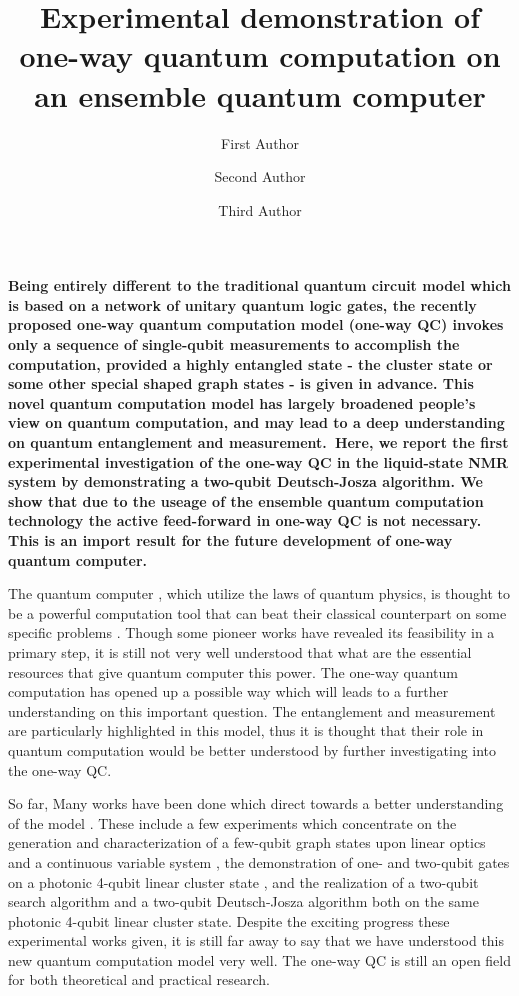 \documentclass[showpacs,superscriptaddress,twocolumn,prl]{revtex4}
\begin{document}
\title{Experimental demonstration of one-way quantum computation on an
ensemble quantum computer}
\author{First Author}
\author{Second Author}
\author{Third Author}
\maketitle

\textbf{Being entirely different to the traditional quantum circuit model
\cite{Chuang} which is based on a network of unitary quantum logic gates,
the recently proposed one-way quantum computation model (one-way QC) \cite%
{onewayPRL,onewayPRA} invokes only a sequence of single-qubit measurements
to accomplish the computation, provided a highly entangled state - the
cluster state \cite{clusterstate} or some other special shaped graph states
\cite{othergraph} - is given in advance. This novel quantum computation
model has largely broadened people's view on quantum computation, and may
lead to a deep understanding on quantum entanglement and measurement.\ Here,
we report the first experimental investigation of the one-way QC in the
liquid-state NMR system by demonstrating a two-qubit Deutsch-Josza
algorithm. We show that due to the useage of the ensemble quantum
computation technology the active feed-forward in one-way QC is not
necessary. This is an import result for the future development of one-way
quantum computer.}

The quantum computer \cite{Chuang}, which utilize the laws of quantum
physics, is thought to be a powerful computation tool that can beat their
classical counterpart on some specific problems \cite{DJ,Grover,Shor}.
Though some pioneer works \cite{pioneer} have revealed its feasibility in a
primary step, it is still not very well understood that what are the
essential resources that give quantum computer this power. The one-way
quantum computation has opened up a possible way which will leads to a
further understanding on this important question. The entanglement and
measurement are particularly highlighted in this model, thus it is thought
that their role in quantum computation would be better understood by further
investigating into the one-way QC.

So far, Many works have been done which direct towards a better
understanding of the model \cite%
{othergraph,tworks,eworkn1,ework1,ework2,eworkn2,eworkdj}. These include a
few experiments which concentrate on the generation and characterization of
a few-qubit graph states upon linear optics \cite{eworkn1,ework1} and a
continuous variable system \cite{ework2}, the demonstration of one- and
two-qubit gates on a photonic 4-qubit linear cluster state \cite%
{eworkn1,eworkn2}, and the realization of a two-qubit search algorithm \cite%
{eworkn1,eworkn2} and a two-qubit Deutsch-Josza algorithm \cite{eworkdj}
both on the same photonic 4-qubit linear cluster state. Despite the exciting
progress these experimental works given, it is still far away to say that we
have understood this new quantum computation model very well. The one-way QC
is still an open field for both theoretical and practical research.
\end{document}
